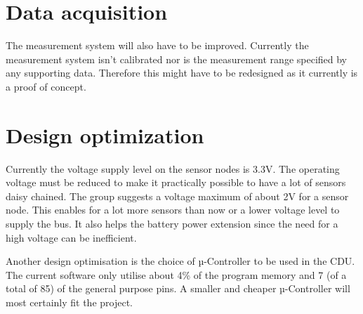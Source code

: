 \section{Data acquisition}
The measurement system will also have to be improved. Currently the measurement system isn't calibrated nor is the measurement range specified by any supporting data. Therefore this might have to be redesigned as it currently is a proof of concept.

\section{Design optimization}
\label{sec:DO}
Currently the voltage supply level on the sensor nodes is 3.3V. The operating voltage must be reduced to make it practically possible to have a lot of sensors daisy chained. The group suggests a voltage maximum of about 2V for a sensor node. This enables for a lot more sensors than now or a lower voltage level to supply the bus. It also helps the battery power extension since the need for a high voltage can be inefficient.

Another design optimisation is the choice of µ-Controller to be used in the CDU. The current software only utilise about 4\% of the program memory and 7 (of a total of 85) of the general purpose pins. A smaller and cheaper µ-Controller will most certainly fit the project.